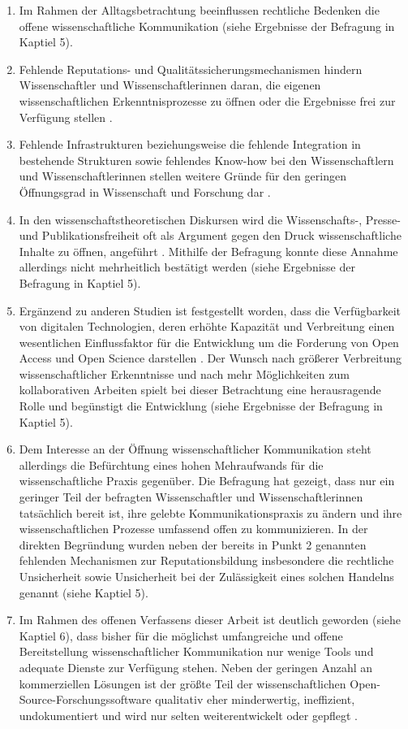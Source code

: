 \begin{enumerate}
\item Im Rahmen der Alltagsbetrachtung beeinflussen rechtliche Bedenken die offene wissenschaftliche Kommunikation (siehe Ergebnisse der Befragung in Kaptiel 5).
\item Fehlende Reputations- und Qualitätssicherungsmechanismen hindern Wissenschaftler und Wissenschaftlerinnen daran, die eigenen wissenschaftlichen Erkenntnisprozesse zu öffnen oder die Ergebnisse frei zur Verfügung stellen \cite{herb_2015}.
\item Fehlende Infrastrukturen beziehungsweise die fehlende Integration in bestehende Strukturen sowie fehlendes Know-how bei den Wissenschaftlern und Wissenschaftlerinnen stellen weitere Gründe für den geringen Öffnungsgrad in Wissenschaft und Forschung dar \cite{European_Commission_2015b}.
\item In den wissenschaftstheoretischen Diskursen wird die Wissenschafts-, Presse- und Publikationsfreiheit oft als Argument gegen den Druck wissenschaftliche Inhalte zu öffnen, angeführt \cite{Fehling_2014}. Mithilfe der Befragung konnte diese Annahme allerdings nicht mehrheitlich bestätigt werden (siehe Ergebnisse der Befragung in Kaptiel 5).
\item Ergänzend zu anderen Studien ist festgestellt worden, dass die Verfügbarkeit von digitalen Technologien, deren erhöhte Kapazität und Verbreitung einen wesentlichen Einflussfaktor für die Entwicklung um die Forderung von Open Access und Open Science darstellen \cite{European_Commission_2015b}. Der Wunsch nach größerer Verbreitung wissenschaftlicher Erkenntnisse und nach mehr Möglichkeiten zum kollaborativen Arbeiten spielt bei dieser Betrachtung eine herausragende Rolle und begünstigt die Entwicklung (siehe Ergebnisse der Befragung in Kaptiel 5).
\item Dem Interesse an der Öffnung wissenschaftlicher Kommunikation steht allerdings die Befürchtung eines hohen Mehraufwands für die wissenschaftliche Praxis gegenüber. Die Befragung hat gezeigt, dass nur ein geringer Teil der befragten Wissenschaftler und Wissenschaftlerinnen tatsächlich bereit ist, ihre gelebte Kommunikationspraxis zu ändern und ihre wissenschaftlichen Prozesse umfassend offen zu kommunizieren. In der direkten Begründung wurden neben der bereits in Punkt 2 genannten fehlenden Mechanismen zur Reputationsbildung insbesondere die rechtliche Unsicherheit sowie Unsicherheit bei der Zulässigkeit eines solchen Handelns genannt (siehe Kaptiel 5).
\item Im Rahmen des offenen Verfassens dieser Arbeit ist deutlich geworden (siehe Kaptiel 6), dass bisher für die möglichst umfangreiche und offene Bereitstellung wissenschaftlicher Kommunikation nur wenige Tools und adequate Dienste zur Verfügung stehen. Neben der geringen Anzahl an kommerziellen Lösungen ist der größte Teil der wissenschaftlichen Open-Source-Forschungssoftware qualitativ eher minderwertig, ineffizient, undokumentiert und wird nur selten weiterentwickelt oder gepflegt \cite{Hey_2015}.

\end{enumerate}
